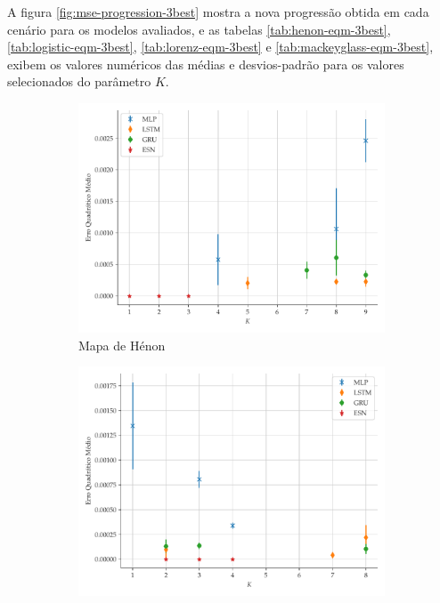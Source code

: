 \documentclass[a4paper, 12pt]{article}
\begin{document}
A figura \ref{fig:mse-progression-3best} mostra a nova progressão obtida em cada cenário para os modelos avaliados, e as tabelas \ref{tab:henon-eqm-3best}, \ref{tab:logistic-eqm-3best}, \ref{tab:lorenz-eqm-3best} e \ref{tab:mackeyglass-eqm-3best}, exibem os valores numéricos das médias e desvios-padrão para os valores selecionados do parâmetro $K$.
\begin{figure}[!ht]
     \begin{subfigure}[t]{0.45\textwidth} 
         \includegraphics[scale=0.4]{henon-3best.pdf}
         \caption{Mapa de Hénon}
     \end{subfigure}
     \centering
     \begin{subfigure}[t]{0.45\textwidth} 
         \includegraphics[scale=0.4]{logistic-3best.pdf}

\end{subfigure}
\end{figure}
\end{document}
